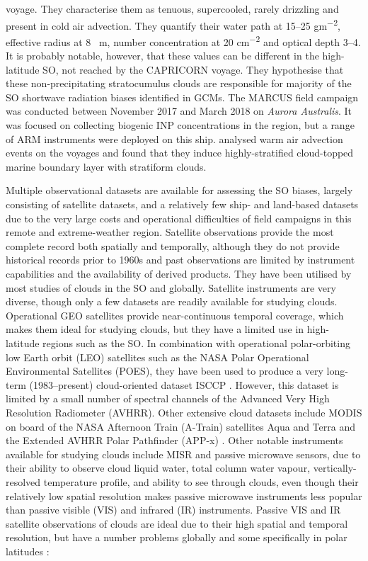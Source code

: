 voyage. They characterise them as tenuous, supercooled, rarely drizzling
and present in cold air advection. They quantify their water path at 15--25 \unit{gm^{-2}},
effective radius at 8 \unit{\mu m}, number concentration at 20 \unit{cm^{-2}} and optical
depth 3--4. It is probably notable, however, that these values can be different
in the high-latitude SO, not reached by the CAPRICORN voyage. They hypothesise
that these non-precipitating stratocumulus clouds are responsible for majority
of the SO shortwave radiation biases identified in GCMs.
The MARCUS field campaign was conducted between November 2017 and March 2018
on \textit{Aurora Australis}. It was focused on collecting biogenic INP concentrations in the region,
but a range of ARM instruments were deployed on this ship.
\cite{zheng2019} analysed warm air advection events on the voyages and found
that they induce highly-stratified cloud-topped marine boundary layer with
stratiform clouds.

Multiple observational datasets are available for assessing the SO biases,
largely consisting of satellite datasets, and a relatively few ship- and
land-based datasets due to the very large costs and operational difficulties
of field campaigns in this remote and extreme-weather region. 
Satellite observations provide the most complete record both spatially and
temporally, although they do not provide historical records prior to
1960s and past observations are limited by instrument capabilities and
the availability of derived products. They have been utilised by most studies
of clouds in the SO and globally. Satellite instruments are very diverse, though only a few
datasets are readily available for studying clouds.
Operational GEO satellites provide near-continuous temporal
coverage,
which makes them ideal for studying clouds, but they have a limited use in
high-latitude regions such as the SO. In combination with operational polar-orbiting
low Earth orbit (LEO) satellites such as the NASA
Polar Operational Environmental Satellites (POES),
they have been used to produce a very long-term (1983--present) cloud-oriented
dataset ISCCP
\citep{schiffer1983}. However, this dataset is limited by
a small number of spectral channels of the Advanced Very High Resolution Radiometer
(AVHRR). Other extensive
cloud datasets include MODIS
on board of the NASA Afternoon Train (A-Train) satellites Aqua and Terra
and the Extended AVHRR Polar Pathfinder (APP-x) \citep{meier1997}. Other notable instruments available
for studying clouds include MISR
and passive
microwave sensors, due to their ability to observe cloud liquid water,
total column water vapour, vertically-resolved temperature profile, and
ability to see through clouds, even though their relatively low spatial
resolution makes passive microwave instruments less popular than passive visible (VIS) and infrared (IR)
instruments.
Passive VIS and IR satellite observations of clouds are ideal due to their high
spatial and temporal resolution, but have a number problems globally and some
specifically in polar latitudes \citep{bromwich2012}:

